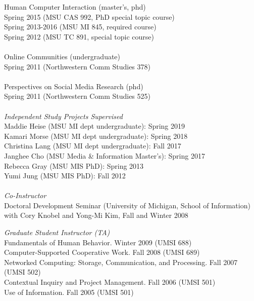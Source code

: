 \documentclass[9pt]{extarticle}
\begin{document}
\begin{tabbing}
Human Computer Interaction (master's, phd) \\
\hspace{0.5cm} Spring 2015 (MSU CAS 992, PhD special topic course) \\
\hspace{0.5cm} Spring 2013-2016 (MSU MI 845, required course) \\
\hspace{0.5cm} Spring 2012 (MSU TC 891, special topic course) \\\\

Online Communities (undergraduate) \\
\hspace{0.5cm} Spring 2011 (Northwestern Comm Studies 378) \\\\

Perspectives on Social Media Research (phd)\\
\hspace{0.5cm} Spring 2011 (Northwestern Comm Studies 525) \\\\ 

\emph{Independent Study Projects Supervised} \\[1pt]
Maddie Heise (MSU MI dept undergraduate): Spring 2019 \\
Kamari Morse (MSU MI dept undergraduate): Spring 2018 \\
Christina Lang (MSU MI dept undergraduate): Fall 2017 \\
Janghee Cho (MSU Media \& Information Master's): Spring 2017 \\
Rebecca Gray (MSU MIS PhD): Spring 2013 \\
Yumi Jung (MSU MIS PhD): Fall 2012 \\\\

\emph{Co-Instructor} \\[1pt]
Doctoral Development Seminar (University of Michigan, School of Information) \\
\hspace{0.5cm} with Cory Knobel and Yong-Mi Kim, Fall and Winter 2008 

\emph{Graduate Student Instructor (TA)} \\
Fundamentals of Human Behavior. Winter 2009 (UMSI 688) \\
Computer-Supported Cooperative Work. Fall 2008 (UMSI 689) \\ 
Networked Computing: Storage, Communication, and Processing. Fall 2007 (UMSI 502) \\
Contextual Inquiry and Project Management. Fall 2006 (UMSI 501) \\
Use of Information. Fall 2005 (UMSI 501) 
\end{tabbing}
\end{document}

